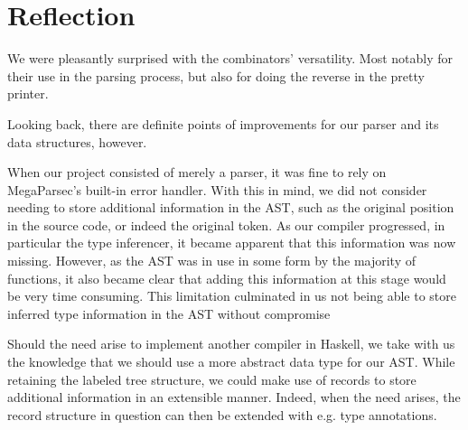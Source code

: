 \section{Reflection}

We were pleasantly surprised with the combinators' versatility.
Most notably for their use in the parsing process, but also for doing the reverse in the pretty printer.

Looking back, there are definite points of improvements for our parser and its data structures, however.

When our project consisted of merely a parser, it was fine to rely on MegaParsec's built-in error handler.
With this in mind, we did not consider needing to store additional information in the AST, such as the original position in the source code, or indeed the original token.
As our compiler progressed, in particular the type inferencer, it became apparent that this information was now missing.
However, as the AST was in use in some form by the majority of functions, it also became clear that adding this information at this stage would be very time consuming.
This limitation culminated in us not being able to store inferred type information in the AST without compromise

Should the need arise to implement another compiler in Haskell, we take with us the knowledge that we should use a more abstract data type for our AST.
While retaining the labeled tree structure, we could make use of records to store additional information in an extensible manner.
Indeed, when the need arises, the record structure in question can then be extended with e.g. type annotations.
